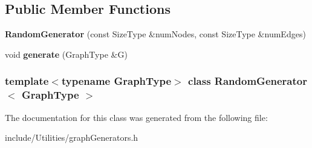 \subsection*{Public Member Functions}
\begin{DoxyCompactItemize}
\item 
\hypertarget{class_random_generator_abdba53c760c3bba47c8bb0379da525dc}{
{\bfseries RandomGenerator} (const SizeType \&numNodes, const SizeType \&numEdges)}
\label{class_random_generator_abdba53c760c3bba47c8bb0379da525dc}

\item 
\hypertarget{class_random_generator_aaff263d290c06465213154659024b702}{
void {\bfseries generate} (GraphType \&G)}
\label{class_random_generator_aaff263d290c06465213154659024b702}

\end{DoxyCompactItemize}
\subsubsection*{template$<$typename GraphType$>$ class RandomGenerator$<$ GraphType $>$}



The documentation for this class was generated from the following file:\begin{DoxyCompactItemize}
\item 
include/Utilities/graphGenerators.h\end{DoxyCompactItemize}

